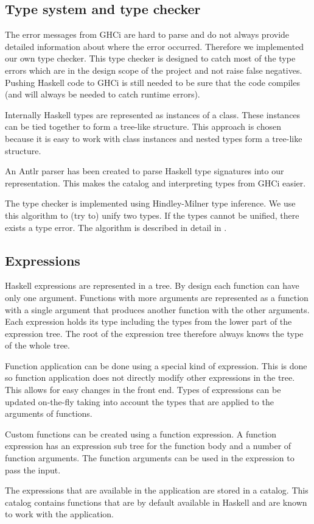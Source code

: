 \subsection{Type system and type checker}

The error messages from GHCi are hard to parse and do not always provide detailed information about where the error
occurred. Therefore we implemented our own type checker. This type checker is designed to catch most of the type errors 
which are in the design scope of the project and not raise false negatives. Pushing Haskell code to GHCi is still needed
to be sure that the code compiles (and will always be needed to catch runtime errors).

Internally Haskell types are represented as instances of a class. These instances can be tied together to form a
tree-like structure. This approach is chosen because it is easy to work with class instances and nested types form
a tree-like structure. 

An Antlr parser has been created to parse Haskell type signatures into our representation. This makes the catalog and interpreting types from GHCi easier.

The type checker is implemented using Hindley-Milner type inference. We use this algorithm to (try to) unify two
types. If the types cannot be unified, there exists a type error. The algorithm is described in detail in
\cite{borisov}.  

\subsection{Expressions}

Haskell expressions are represented in a tree.
By design each function can have only one argument.
Functions with more arguments are represented as a function with a single argument that produces another function with the other arguments.
Each expression holds its type including the types from the lower part of the expression tree. The root of the
expression tree therefore always knows the type of the whole tree.

Function application can be done using a special kind of expression.
This is done so function application does not directly modify other expressions in the tree.
This allows for easy changes in the front end.
Types of expressions can be updated on-the-fly taking into account the types that are applied to the arguments of functions.

Custom functions can be created using a function expression.
A function expression has an expression sub tree for the function body and a number of function arguments.
The function arguments can be used in the expression to pass the input.

The expressions that are available in the application are stored in a catalog. This catalog contains functions that are
by default available in Haskell and are known to work with the application.

